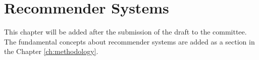 \chapter{Recommender Systems}
\label{ch:recsys}

    This chapter will be added after the submission of the draft to the committee. The fundamental concepts about recommender systems are added as a section in the Chapter \ref{ch:methodology}.

